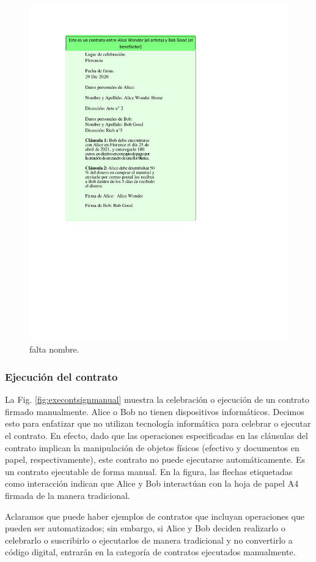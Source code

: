 \documentclass[12pt]{report} %
\begin{document}
\begin{figure}
\centering
\includegraphics[width=0.85\columnwidth]{imagenes/ejcontfirmman.pdf}
\caption{falta nombre.}
\label{ejcontfirmman.pdf}
\end{figure} 

\subsubsection{Ejecución del contrato}

La Fig. \ref{fig:execontsignmanual} muestra la celebración o ejecución de un contrato firmado manualmente. Alice o Bob no tienen dispositivos informáticos. Decimos esto para enfatizar que no utilizan tecnología informática para celebrar o ejecutar el contrato. En efecto, dado que las operaciones especificadas en las cláusulas del contrato implican la manipulación de objetos físicos (efectivo y documentos en papel, respectivamente), este contrato no puede ejecutarse automáticamente. Es un contrato ejecutable de forma manual. En la figura, las flechas etiquetadas como interacción indican que Alice y Bob interactúan con la hoja de papel A4 firmada de la manera tradicional.

Aclaramos que puede haber ejemplos de contratos que incluyan operaciones que pueden ser automatizados; sin embargo, si Alice y Bob deciden realizarlo o celebrarlo o suscribirlo o ejecutarlos de manera tradicional y no convertirlo a código digital, entrarán en la categoría de contratos ejecutados manualmente.
\end{document}
